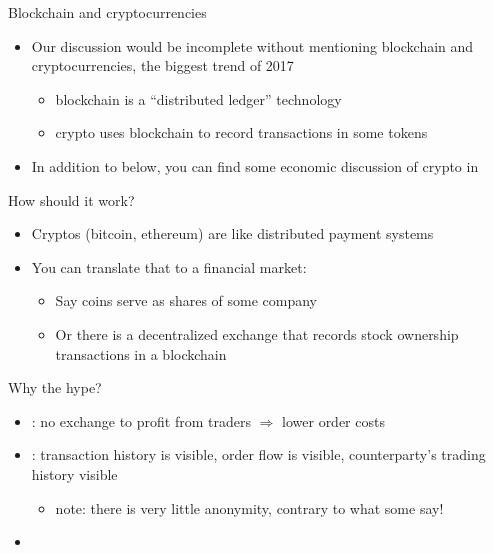 \documentclass[english,10pt
,aspectratio=169
]{beamer}
\begin{document}
\begin{frame}{Blockchain and cryptocurrencies}
	\begin{itemize}
		\item Our discussion would be incomplete without mentioning \alert{blockchain} and \alert{cryptocurrencies}, the biggest trend of 2017
		\begin{itemize}
			\item blockchain is a ``distributed ledger'' technology
			\item crypto uses blockchain to record transactions in some tokens
		\end{itemize}
		\item In addition to below, you can find some economic discussion of crypto in \citet*{nica_cryptocurrencies_2017}
	\end{itemize}
\end{frame}


\begin{frame}{How should it work?}
	\begin{itemize}
		\item Cryptos (bitcoin, ethereum) are like distributed payment systems
		\item You can translate that to a financial market:
		\begin{itemize}
			\item Say coins serve as shares of some company
			\item Or there is a decentralized exchange that records stock ownership transactions in a blockchain
		\end{itemize}
	\end{itemize}
\end{frame}


\begin{frame}{Why the hype?}
	\begin{itemize}
		\item {}: no exchange to profit from traders $\Rightarrow$ lower order costs
		\item {}: transaction history is visible, order flow is visible, counterparty's trading history visible
		\begin{itemize}
			\item note: there is very little anonymity, contrary to what some say!
		\end{itemize}
		\item {}
	\end{itemize}
\end{frame}
\end{document}
